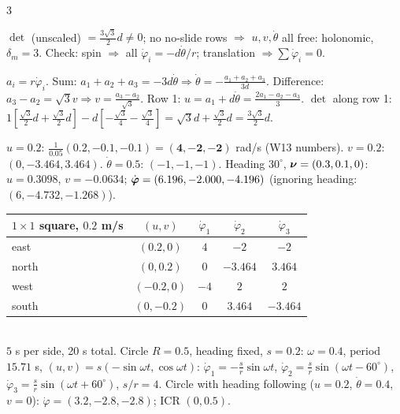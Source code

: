 \begin{multicols}{3}
\begin{fbx}
$\det$ (unscaled) $=\frac{3\sqrt3}2d\ne0$; no no-slide rows $\Rightarrow$ $u,v,\dot\theta$ all free: holonomic, $\delta_m=3$. Check: spin $\Rightarrow$ all $\dot\varphi_i=-d\dot\theta/r$; translation $\Rightarrow\sum\dot\varphi_i=0$. \chk
\end{fbx}
\begin{deriv}
$a_i=r\dot\varphi_i$. Sum: $a_1+a_2+a_3=-3d\dot\theta\Rightarrow\dot\theta=-\frac{a_1+a_2+a_3}{3d}$. Difference: $a_3-a_2=\sqrt3v\Rightarrow v=\frac{a_3-a_2}{\sqrt3}$. Row 1: $u=a_1+d\dot\theta=\frac{2a_1-a_2-a_3}3$. $\det$ along row 1: $1[\frac{\sqrt3}2d+\frac{\sqrt3}2d]-d[-\frac{\sqrt3}4-\frac{\sqrt3}4]=\sqrt3d+\frac{\sqrt3}2d=\frac{3\sqrt3}2d$.
\end{deriv}
\begin{worked}[$d=0.10$, $r=0.05$ \chk]
$u=0.2$: $\frac1{0.05}(0.2,-0.1,-0.1)=\mathbf{(4,-2,-2)}$ rad/s (W13 numbers). $v=0.2$: $(0,-3.464,3.464)$. $\dot\theta=0.5$: $(-1,-1,-1)$.
Heading $30^\circ$, $\boldsymbol\nu=(0.3,0.1,0)$: $u=0.3098$, $v=-0.0634$; $\dot{\boldsymbol\varphi}=(6.196,-2.000,-4.196)$ (ignoring heading: $(6,-4.732,-1.268)$).
\end{worked}
\begin{worked}[omni paths, $\dot\theta=0$, $\theta=0$: $\wXz=\wXn$ \chk]
\small\begin{tabular}{@{}lcccc@{}}\toprule
$1\times1$ square, $0.2$ m/s & $(u,v)$ & $\dot\varphi_1$ & $\dot\varphi_2$ & $\dot\varphi_3$\\\midrule
east & $(0.2,0)$ & $4$ & $-2$ & $-2$\\
north & $(0,0.2)$ & $0$ & $-3.464$ & $3.464$\\
west & $(-0.2,0)$ & $-4$ & $2$ & $2$\\
south & $(0,-0.2)$ & $0$ & $3.464$ & $-3.464$\\\bottomrule\end{tabular}\\
$5$ s per side, 20 s total. Circle $R=0.5$, heading fixed, $s=0.2$: $\omega=0.4$, period $15.71$ s, $(u,v)=s(-\sin\omega t,\cos\omega t)$: $\dot\varphi_1=-\frac sr\sin\omega t$, $\dot\varphi_2=\frac sr\sin(\omega t-60^\circ)$, $\dot\varphi_3=\frac sr\sin(\omega t+60^\circ)$, $s/r=4$. Circle with heading following ($u=0.2$, $\dot\theta=0.4$, $v=0$): $\dot\varphi=(3.2,-2.8,-2.8)$; ICR $(0,0.5)$.
\end{worked}


\end{multicols}
